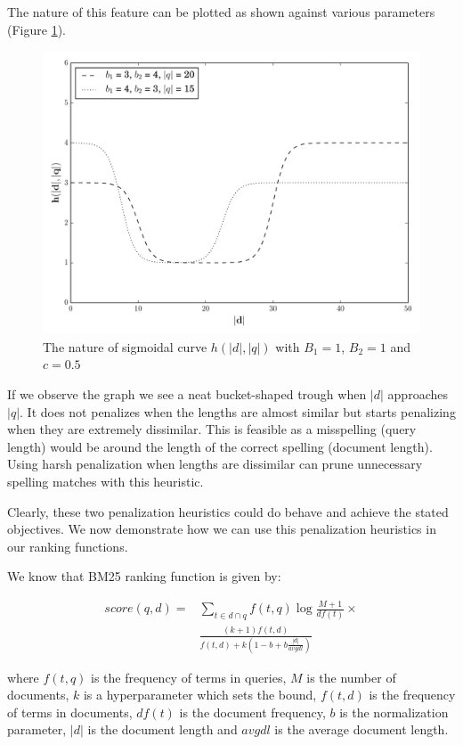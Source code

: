 The nature of this feature can be plotted as shown against various parameters (Figure \ref{nature}).

\begin{figure}[h]
	\centering
	\includegraphics[width=\textwidth]{gfx/test.pdf}
	\caption{The nature of sigmoidal curve $h(|d|, |q|)$ with $B_1 = 1$, $B_2 = 1$ and $c = 0.5$}
	\label{nature}
\end{figure}

If we observe the graph we see a neat bucket-shaped trough when $|d|$ approaches $|q|$. It does not penalizes when the lengths are almost similar but starts penalizing when they are extremely dissimilar. This is feasible as a misspelling (query length) would be around the length of the correct spelling (document length). Using harsh penalization when lengths are dissimilar can prune unnecessary spelling matches with this heuristic.

Clearly, these two penalization heuristics could do behave and achieve the stated objectives. We now demonstrate how we can use this penalization heuristics in our ranking functions.

We know that BM25 ranking function is given by:

\begin{align*}
	score(q, d) = & \sum_{t \in d \cap q} f(t, q) \log \frac{M + 1}{df(t)} \times \\
	& \frac{ (k + 1) f (t, d) }{f(t, d) + k \left( 1 - b + b \frac{|d|}{avgdl} \right)} 
\end{align*}

where $f(t, q)$ is the frequency of terms in queries, $M$ is the number of documents, $k$ is a hyperparameter which sets the bound, $f(t, d)$ is the frequency of terms in documents, $df(t)$ is the document frequency, $b$ is the normalization parameter, $|d|$ is the document length and $avgdl$ is the average document length.

